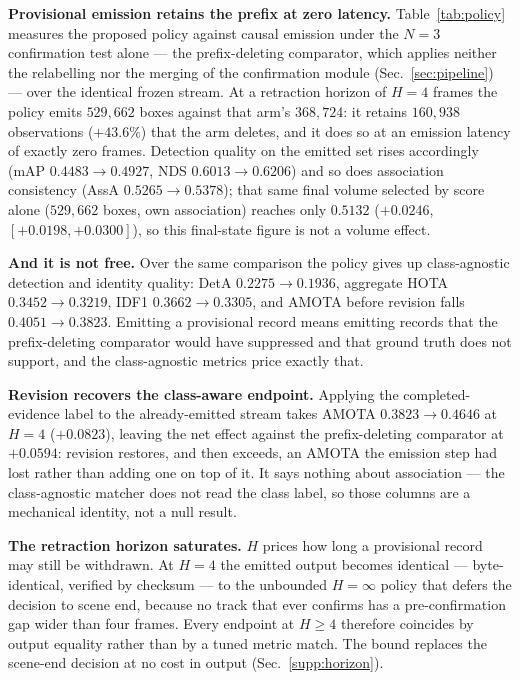 \noindent\textbf{Provisional emission retains the prefix at zero latency.}
Table~\ref{tab:policy} measures the proposed policy against causal emission
under the $N{=}3$ confirmation test alone --- the prefix-deleting comparator,
which applies neither the relabelling nor the merging of the confirmation
module (Sec.~\ref{sec:pipeline}) --- over the identical frozen stream. At a retraction
horizon of $H{=}4$ frames the policy emits $529{,}662$ boxes against that arm's
$368{,}724$: it retains $160{,}938$ observations ($+43.6\%$) that the arm
deletes, and it does so at an emission latency of exactly zero frames. Detection
quality on the emitted set rises accordingly (mAP $0.4483\!\to\!0.4927$, NDS
$0.6013\!\to\!0.6206$) and so does association consistency
(AssA $0.5265\!\to\!0.5378$); that same final volume selected by score alone
($529{,}662$ boxes, own association) reaches only $0.5132$
($+0.0246$, $[{+}0.0198,{+}0.0300]$), so this final-state figure is not a
volume effect.

\noindent\textbf{And it is not free.} Over the same comparison the policy
gives up class-agnostic detection and identity quality: DetA
$0.2275\!\to\!0.1936$, aggregate HOTA $0.3452\!\to\!0.3219$, IDF1
$0.3662\!\to\!0.3305$, and AMOTA before revision falls
$0.4051\!\to\!0.3823$. Emitting a provisional record means emitting records
that the prefix-deleting comparator would have suppressed and that ground truth does not support, and
the class-agnostic metrics price exactly that.

\noindent\textbf{Revision recovers the class-aware endpoint.} Applying the
completed-evidence label to the already-emitted stream takes AMOTA
$0.3823\!\to\!0.4646$ at $H{=}4$ ($+0.0823$), leaving the net effect against
the prefix-deleting comparator at $+0.0594$: revision restores, and then
exceeds, an AMOTA the emission step had lost rather than adding one on top of
it. It says nothing about association --- the class-agnostic matcher does not
read the class label, so those columns are a mechanical identity, not a null
result.

\noindent\textbf{The retraction horizon saturates.} $H$ prices how long a
provisional record may still be withdrawn. At $H{=}4$ the emitted output
becomes identical --- byte-identical, verified by checksum --- to the
unbounded $H{=}\infty$ policy that defers the decision to scene end, because no
track that ever confirms has a pre-confirmation gap wider than four frames.
Every endpoint at $H\!\ge\!4$ therefore coincides by output equality rather
than by a tuned metric match. The bound replaces the scene-end decision at no cost
in output (Sec.~\ref{supp:horizon}).

